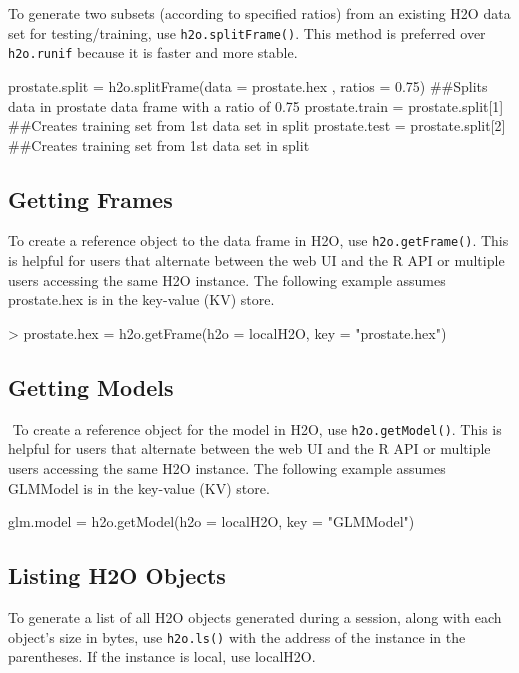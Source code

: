\documentclass[11pt]{article}
\begin{document}
\begin{enumerate}
To generate two subsets (according to specified ratios) from an existing H2O data set for testing/training, use {\texttt{h2o.splitFrame()}}.  This method is preferred over {\texttt{h2o.runif}} because it is faster and more stable. 

\begin{spverbatim}

prostate.split = h2o.splitFrame(data = prostate.hex , ratios = 0.75)
##Splits data in prostate data frame with a ratio of 0.75
prostate.train = prostate.split[1] 
##Creates training set from 1st data set in split
prostate.test = prostate.split[2]
##Creates training set from 1st data set in split
\end{spverbatim}


\subsection{Getting Frames}

To create a reference object to the data frame in H2O, use {\texttt{h2o.getFrame()}}. This is helpful for  users that alternate between the web UI and the R API or multiple users accessing the same H2O instance. The following example assumes prostate.hex is in the key-value (KV) store.

\begin{spverbatim}
> prostate.hex = h2o.getFrame(h2o = localH2O, key = "prostate.hex")
\end{spverbatim}


\subsection{Getting Models}
 To create a reference object for the model in H2O, use {\texttt{h2o.getModel()}}. This is helpful for  users that alternate between the web UI and the R API or multiple users accessing the same H2O instance. The following example assumes GLMModel is in the key-value (KV) store.
\begin{spverbatim}
glm.model = h2o.getModel(h2o = localH2O, key = "GLMModel")
\end{spverbatim}

\subsection{Listing H2O Objects}

To generate a list of all H2O objects generated during a session, along with each object’s size in bytes, use {\texttt{h2o.ls()}} with the address of the instance in the parentheses. If the instance is local, use localH2O. 


\end{enumerate}
\end{document}

